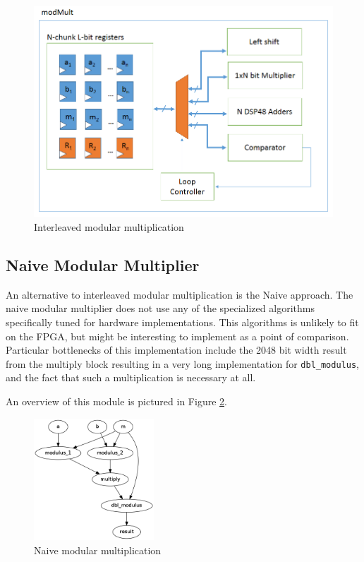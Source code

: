 \documentclass[12pt]{article}
\begin{document}
\begin{figure}
  \begin{centering}
    \includegraphics[width=\textwidth]{modmult.png}
    \caption{Interleaved modular multiplication}
    \label{fig-inter}
  \end{centering}
\end{figure}

\subsection{Naive Modular Multiplier}
An alternative to interleaved modular multiplication is the Naive approach.
The naive modular multiplier does not use any of the specialized algorithms
specifically tuned for hardware implementations.
This algorithms is unlikely to fit on the FPGA,
but might be interesting to implement as a point of comparison.
Particular bottlenecks of this implementation include the 2048 bit width result from the multiply block
resulting in a very long implementation for {\tt dbl\_modulus},
and the fact that such a multiplication is necessary at all.

An overview of this module is pictured in Figure \ref{fig-naive}.

\begin{figure}
  \begin{centering}
    \includegraphics[width=0.4\textwidth]{modMultGraph.png}
    \caption{Naive modular multiplication}
    \label{fig-naive}
  \end{centering}
\end{figure}
\end{document}
